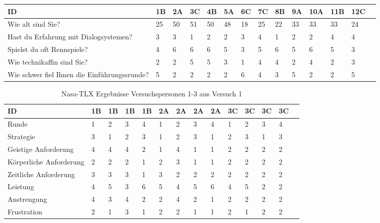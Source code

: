 \documentclass[12pt,a4paper]{scrartcl}
\begin{document}
\begin{appendix}
\begin{table}
\smallskip
\begin{tabular}{|p{6cm}| p{0.6cm} | p{0.6cm} | p{0.6cm} | p{0.6cm} | p{0.6cm} | p{0.6cm} | p{0.6cm} | p{0.6cm} | p{0.6cm} | p{0.6cm} | p{0.6cm} | p{0.6cm} | p{} | }
\hline
	ID & 1B & 2A & 3C & 4B & 5A & 6C & 7C & 8B & 9A & 10A & 11B & 12C \\ \hline \hline
	Wie alt sind Sie? & 25 & 50 & 51 & 50 & 48 & 18 & 25 & 22 & 33 & 33 & 33 & 24 \\ \hline
	Hast du Erfahrung mit Dialogsystemen? & 3 & 3 & 1 & 2 & 2 & 3 & 4 & 1 & 2 & 2 & 4 & 4 \\ \hline
	Spielst du oft Rennspiele? & 4 & 6 & 6 & 6 & 5 & 3 & 5 & 6 & 5 & 6 & 5 & 3 \\ \hline
	Wie technikaffin sind Sie? & 2 & 2 & 5 & 5 & 3 & 1 & 4 & 4 & 2 & 4 & 2 & 3 \\ \hline
	Wie schwer fiel Ihnen die Einführungssrunde? & 5 & 2 & 2 & 2 & 2 & 6 & 4 & 3 & 5 & 2 & 2 & 5 \\ \hline
\end{tabular}
\end{table}

\begin{table}
\caption{Nasa-TLX Ergebnisse Versuchspersonen 1-3 aus Versuch 1}

\smallskip
\begin{tabular}{|p{6cm}| p{0.8cm} | p{0.8cm} | p{0.8cm} | p{0.8cm} || p{0.8cm} | p{0.8cm} | p{0.8cm} | p{0.8cm} || p{0.8cm} | p{0.8cm} | p{0.8cm} | p{0.8cm} | p{} | }
\hline

	ID & 1B & 1B & 1B & 1B & 2A & 2A & 2A & 2A & 3C & 3C & 3C & 3C \\ \hline \hline
	Runde & 1 & 2 & 3 & 4 & 1 & 2 & 3 & 4 & 1 & 2 & 3 & 4 \\ \hline 
	Strategie & 3 & 1 & 2 & 3 & 1 & 2 & 3 & 1 & 2 & 3 & 1 & 3 \\ \hline \hline
	Geistige Anforderung & 4 & 4 & 4 & 2 & 1 & 4 & 1 & 1 & 2 & 2 & 2 & 2 \\ \hline
	Körperliche Anforderung & 2 & 2 & 2 & 1 & 2 & 3 & 1 & 1 & 2 & 2 & 2 & 2 \\ \hline
	Zeitliche Anforderung & 3 & 3 & 3 & 1 & 3 & 2 & 2 & 2 & 2 & 2 & 2 & 2 \\ \hline
	Leistung & 4 & 5 & 3 & 6 & 5 & 4 & 5 & 6 & 4 & 5 & 2 & 2 \\ \hline
	Anstrengung & 4 & 3 & 4 & 2 & 2 & 4 & 2 & 1 & 2 & 2 & 2 & 2 \\ \hline
	Frustration & 2 & 1 & 3 & 1 & 2 & 2 & 1 & 1 & 2 & 1 & 2 & 2 \\ \hline
\end{tabular}


\end{table}
\end{appendix}
\end{document}
